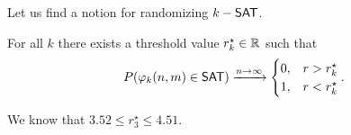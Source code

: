 Let us find a notion for randomizing $k-\mathsf{SAT}$.
\begin{conjecture}
    For all $k$ there exists a threshold value $r_k^\star \in \mathbb{R}$
    such that
    \begin{align}
        P( \phi_k(n,m) \in \SAT) \xrightarrow{n \rightarrow \infty}
        \begin{cases}
            0, & r > r_k^\star \\
            1, & r < r_k^\star \\
        \end{cases}.
    \end{align}
\end{conjecture}
\begin{note}
    We know that $3.52 \leq r_3^\star \leq 4.51$.
\end{note}
